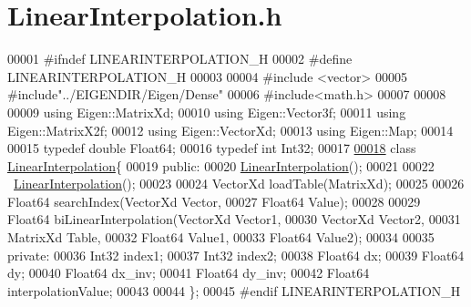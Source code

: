 \hypertarget{_linear_interpolation_8h_source}{}\section{Linear\+Interpolation.\+h}
\label{_linear_interpolation_8h_source}

\begin{DoxyCode}
00001 \textcolor{preprocessor}{#ifndef LINEARINTERPOLATION\_H}
00002 \textcolor{preprocessor}{#define LINEARINTERPOLATION\_H}
00003 
00004 \textcolor{preprocessor}{#include <vector>}
00005 \textcolor{preprocessor}{#include"../EIGENDIR/Eigen/Dense"}
00006 \textcolor{preprocessor}{#include<math.h>}
00007 
00008 
00009 \textcolor{keyword}{using} Eigen::MatrixXd;
00010 \textcolor{keyword}{using} Eigen::Vector3f;
00011 \textcolor{keyword}{using} Eigen::MatrixX2f;
00012 \textcolor{keyword}{using} Eigen::VectorXd;
00013 \textcolor{keyword}{using} Eigen::Map;
00014 
00015 \textcolor{keyword}{typedef} \textcolor{keywordtype}{double} Float64;
00016 \textcolor{keyword}{typedef} \textcolor{keywordtype}{int}    Int32;
00017 
\hyperlink{class_linear_interpolation}{00018} \textcolor{keyword}{class }\hyperlink{class_linear_interpolation}{LinearInterpolation}\{
00019 \textcolor{keyword}{public}:
00020     \hyperlink{class_linear_interpolation}{LinearInterpolation}();
00021 
00022     ~\hyperlink{class_linear_interpolation}{LinearInterpolation}();
00023 
00024     VectorXd loadTable(MatrixXd);
00025 
00026     Float64 searchIndex(VectorXd Vector,
00027                         Float64 Value);
00028 
00029     Float64 biLinearInterpolation(VectorXd Vector1,
00030                                   VectorXd Vector2,
00031                                   MatrixXd Table,
00032                                   Float64 Value1,
00033                                   Float64 Value2);
00034     
00035 \textcolor{keyword}{private}:
00036     Int32       index1;
00037     Int32       index2;
00038     Float64     dx;
00039     Float64     dy;
00040     Float64     dx\_inv;
00041     Float64     dy\_inv;
00042     Float64     interpolationValue;
00043 
00044 \};
00045 \textcolor{preprocessor}{#endif LINEARINTERPOLATION\_H}
\end{DoxyCode}
